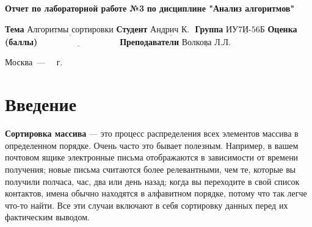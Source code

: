 \documentclass[12pt]{report}
\begin{document}
\begin{titlepage}
	
	\begin{center}
		\noindent\begin{minipage}{1.3\textwidth}\centering
			\Large\textbf{  Отчет по лабораторной работе №3}\newline
			\textbf{по дисциплине "Анализ алгоритмов"}\newline\newline
		\end{minipage}
	\end{center}
	
	\noindent\textbf{Тема} $\underline{\text{Алгоритмы сортировки}}$\newline\newline
	\noindent\textbf{Студент} $\underline{\text{Андрич К. }}$\newline\newline
	\noindent\textbf{Группа} $\underline{\text{ИУ7И-56Б}}$\newline\newline
	\noindent\textbf{Оценка (баллы)} $\underline{\text{~~~~~~~~~~~~~~~~~~~~~~~~~~~}}$\newline\newline
	\noindent\textbf{Преподаватели} $\underline{\text{Волкова Л.Л.}}$\newline\newline\newline
	
	\begin{center}
		\vfill
		Москва~---~\the\year
		~г.
	\end{center}
\end{titlepage}


\tableofcontents

\newpage
\chapter*{Введение}
\textbf {Сортировка массива} — это процесс распределения всех элементов массива в определенном порядке. Очень часто это бывает полезным. Например, в вашем почтовом ящике электронные письма отображаются в зависимости от времени получения; новые письма считаются более релевантными, чем те, которые вы получили полчаса, час, два или день назад; когда вы переходите в свой список контактов, имена обычно находятся в алфавитном порядке, потому что так легче что-то найти. Все эти случаи включают в себя сортировку данных перед их фактическим выводом.
\newline
\end{document}
